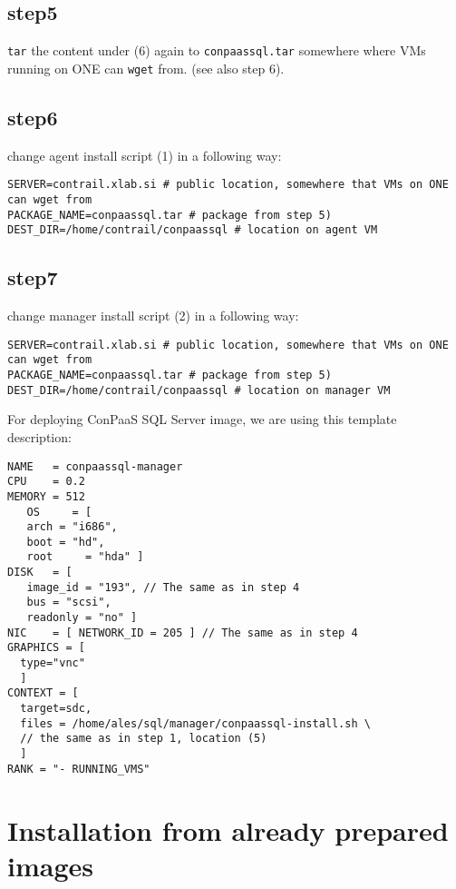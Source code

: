 \documentclass[a4paper,10pt]{article}
\begin{document}
\subsection*{step5}

{\tt tar} the content under (6) again to {\tt conpaassql.tar} somewhere where VMs running on ONE can {\tt wget} from. (see also step 6). 

\subsection*{step6}

change agent install script (1) in a following way:

\begin{Verbatim}[frame=single]
SERVER=contrail.xlab.si # public location, somewhere that VMs on ONE can wget from
PACKAGE_NAME=conpaassql.tar # package from step 5)
DEST_DIR=/home/contrail/conpaassql # location on agent VM
\end{Verbatim}

\subsection*{step7}

change manager install script (2) in a following way:

\begin{Verbatim}[frame=single]
SERVER=contrail.xlab.si # public location, somewhere that VMs on ONE can wget from
PACKAGE_NAME=conpaassql.tar # package from step 5)
DEST_DIR=/home/contrail/conpaassql # location on manager VM
\end{Verbatim}

For deploying ConPaaS SQL Server image, we are using this template description:

\begin{Verbatim}[frame=single]
NAME   = conpaassql-manager
CPU    = 0.2
MEMORY = 512
   OS     = [
   arch = "i686",
   boot = "hd",
   root     = "hda" ]
DISK   = [
   image_id = "193", // The same as in step 4
   bus = "scsi",
   readonly = "no" ]
NIC    = [ NETWORK_ID = 205 ] // The same as in step 4
GRAPHICS = [
  type="vnc"
  ]
CONTEXT = [
  target=sdc,
  files = /home/ales/sql/manager/conpaassql-install.sh \
  // the same as in step 1, location (5)
  ]
RANK = "- RUNNING_VMS"
\end{Verbatim}

\section{Installation from already prepared images}
\label{sec:install-images}
\end{document}
